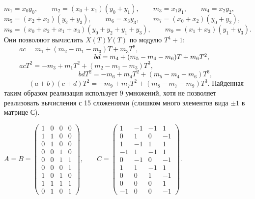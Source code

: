 \documentclass{../../template/mai_book}
\begin{document}
$
m_1 = x_0 y_0,\qquad m_2 = (x_0 + x_1)(y_0 + y_1), \qquad m_3 = x_1 y_1, \qquad  m_4 = x_2 y_2, $ \newline \indent
$ m_5 = (x_2 + x_3)(y_2 + y_3), \qquad  m_6 = x_3 y_3, \qquad  m_7 = (x_0 + x_2)(y_0 + y_2), $ \newline \indent
$m_8 = (x_0 + x_2 + x_1 + x_3)(y_0 + y_2 + y_1 + y_3), \qquad m_9 = (x_1 + x_3)(y_1 + y_3).$
\newline \newline
Они позволяют вычислить $X(T)Y(T)$ по модулю $T^4 + 1$: \newline \newline  \indent
$
\; \; \; \; \; \; \; \; ac = m_1 + (m_2 - m_1 - m_3)T + m_3 T^2,$ \newline \indent
$ \; \; \; \; \; \; \; \; \; \; \; \; \; \; \; \; \; \; \; \; \; \; \; \; \; \; \; \; \; \; \; \; \; \; \; \; \; \; \; \;\; \; \; \; \; \; \; bd = m_4 + (m_5 - m_4 - m_6)T + m_6 T^2, \\
$ \indent
$\; \; \; \; \; \; \; \; acT^2 = -m_3 + m_1 T^2 + (m_2 - m_1 - m_3)T^3,$ \newline \indent
$\; \; \; \; \; \; \; \; \; \; \; \; \; \; \; \; \; \; \; \; \; \; \; \; \; \; \; \; \; \; \; \; \; \; \; \; \; \; \; bdT^2 = -m_6 + m_4 T^2 + (m_5 - m_4 - m_6)T^3,$ \newline \indent
$\; \; \; \; \; \; \; \; \; \; \; \; \; (a + b)(c + d)T^2 = -m_9 + m_7 T^2 + (m_8 - m_7 - m_9)T^3.$ \newline \newline
Найденная таким образом реализация использует 9 умножений, хотя 
не позволяет реализовать вычисления с 15 сложениями (слишком много элементов вида $\pm 1$ в матрице С). \newline 
\begin{center}$A = B = \begin{pmatrix}
1 & 0 & 0 &0\\
1 & 1 & 0 &0\\         
0 & 1 & 0 &0\\
0 & 0 & 1 &0\\
0 & 0 & 1 &1\\
0 & 0 & 0 &1\\         
1 & 0 & 1 &0\\
1 & 1 & 1 &1\\
0 & 1 & 0 & 1
\end{pmatrix}, \; \; \; \; \; \; \; 
C = \begin{pmatrix}
1 & -1 & -1 &1\\
0 & 1 & 0 & -1\\         
1 & -1 & 1 & 1\\
-1 & 1 & -1 & 1\\
0 & -1 & 0 & -1\\
1 & 1 & -1 & 1\\         
0 & 0 & 1 & -1\\
0 & 0 & 0 & 1\\
-1 & 0 & 0 & -1
\end{pmatrix}.
$
\end{center}
\end{document}
